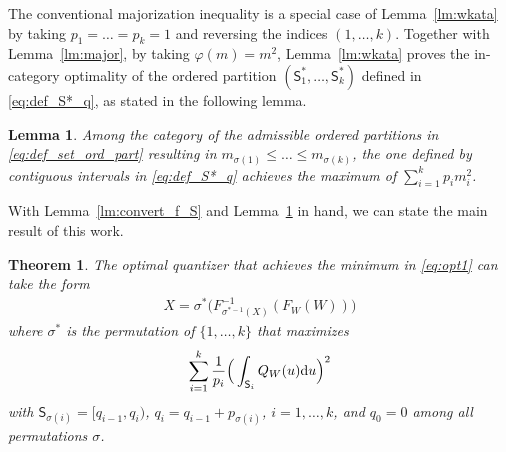 \documentclass[conference]{IEEEtran}
\newtheorem{theorem}{Theorem}%
\newtheorem{lemma}{Lemma}
\def\sS{{\mathsf S}}
\def\rd{{\rm d}}
\begin{document}
The conventional majorization inequality is a special case of Lemma~\ref{lm:wkata} by taking $p_1=\ldots=p_k=1$ and reversing the indices $(1,\ldots,k)$. 
Together with Lemma~\ref{lm:major}, by taking $\varphi(m)=m^2$, Lemma~\ref{lm:wkata} proves the in-category optimality of the ordered partition $(\sS^*_1,\ldots,\sS^*_k)$ defined in \eqref{eq:def_S*_q}, as stated in the following lemma.
\begin{lemma}\label{lm:in-catagory}
Among the category of the admissible ordered partitions in \eqref{eq:def_set_ord_part} resulting in $m_{\sigma(1)} \le \ldots \le m_{\sigma(k)}$, the one defined by contiguous intervals in \eqref{eq:def_S*_q} achieves the maximum of $\sum_{i=1}^k p_{i} m^{2}_{i}$.
\end{lemma}
With Lemma~\ref{lm:convert_f_S} and Lemma~\ref{lm:in-catagory} in hand, we can state the main result of this work.
\begin{theorem}\label{th:main}
The optimal quantizer that achieves the minimum in \eqref{eq:opt1} can take the form
\begin{align}
X = \sigma^*\big(F_{\sigma^{*-1}(X)}^{-1}(F_W(W))\big) \label{eq:thm_f}
\end{align}
where $\sigma^*$ is the permutation of $\{1,\ldots,k\}$ that maximizes
\begin{align}
    \sum_{i=1}^k \frac{1}{p_i} \Big(\int_{\sS_i}Q_W(u) \rd u \Big)^2 \label{eq:thm_Em^2}
\end{align}
with $\sS_{\sigma(i)} = [q_{i-1}, q_i)$, $q_i = q_{i-1} + p_{\sigma(i)}$, $i=1,\ldots,k$,
and $q_0 = 0$ among all permutations $\sigma$.
\end{theorem}
\end{document}

